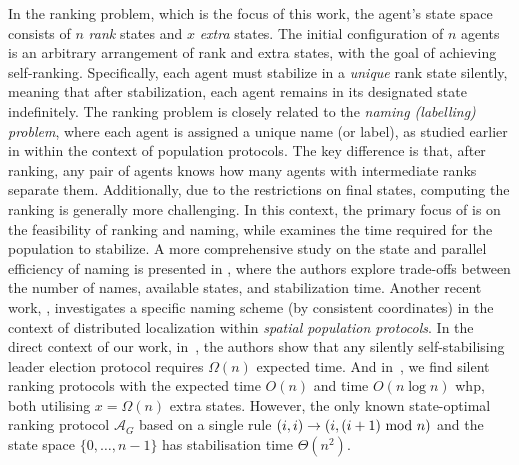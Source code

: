 In the ranking problem, which is the focus of this work, the agent's state space consists of 
$n$ {\em rank} states and $x$ {\em extra} states. The initial configuration of $n$ agents is 
an arbitrary arrangement of rank and extra states, with the goal of achieving self-ranking. 
Specifically, each agent must stabilize in a {\em unique} rank state silently, meaning that 
after stabilization, each agent remains in its designated state indefinitely.
%
The ranking problem is closely related to the {\em naming (labelling) problem}, where each agent is 
assigned a unique name (or label), as studied earlier in \cite{Bea12,Mic13,Bur19,Gas24,Gas25}  within the context 
of population protocols. The key difference is that, after ranking, any pair of agents knows 
how many agents with intermediate ranks separate them. Additionally, due to the restrictions on 
final states, computing the ranking is generally more challenging.
%
In this context, the primary focus of \cite{Bea12,Bur19} is on the feasibility of ranking and naming, 
while \cite{Mic13} examines the time required for the population to stabilize. A more comprehensive study 
on the state and parallel efficiency of naming is presented in \cite{Gas25}, where the authors explore 
trade-offs between the number of names, available states, and stabilization time. Another recent work, 
\cite{Gas24}, investigates a specific naming scheme (by consistent coordinates) in the context of distributed 
localization within {\em spatial population protocols}.
%
In the direct context of our work, in~\cite{BCC+21,DS18}, the authors show that any silently self-stabilising leader election protocol requires $\Omega(n)$ expected time. And in~\cite{BCC+21}, we find silent ranking protocols with the expected time $O(n)$ and time $O(n\log n)$ whp, both utilising $x=\Omega(n)$ extra states. 
However, the only known state-optimal ranking protocol $\mathcal{A}_G$ based on a single rule $(i,i)\rightarrow (i,(i+1) {\rm\ mod\ } n)$ and the state space 
$\{0,\dots,n-1\}$ has stabilisation time $\Theta(n^2).$